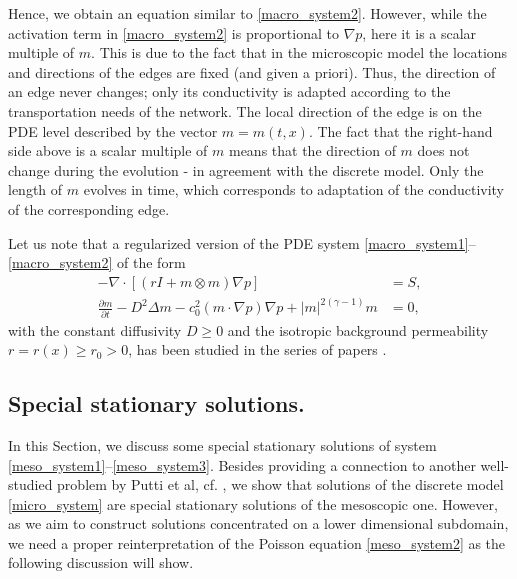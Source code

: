 \documentclass{article}
\numberwithin{equation}{section}
\begin{document}
Hence, we obtain an equation similar to \eqref{macro_system2}. However, while the activation term in \eqref{macro_system2}
is proportional to $\nabla p$, here it is a scalar multiple of $m$. This is due to the fact that in the microscopic model the locations
and directions of the edges are fixed (and given a priori). Thus, the direction of an edge never changes;
only its conductivity is adapted according to the transportation needs of the network.
The local direction of the edge is on the PDE level described by the vector $m=m(t,x)$.
The fact that the right-hand side above is a scalar multiple of $m$ means that the
direction of $m$ does not change during the evolution - in agreement with the discrete model.
Only the length of $m$ evolves in time, which corresponds to adaptation of the conductivity of the corresponding edge.

Let us note that a regularized version of the PDE system \eqref{macro_system1}--\eqref{macro_system2} of the form
\begin{align*}
   -\nabla \cdot [(rI+m\otimes m )\nabla p]&=S, \\
   \frac{\partial m}{\partial t}-D^2 \Delta m -c_0^2 (m\cdot \nabla p)\nabla p +|m|^{2(\gamma-1)}m&=0,
\end{align*}
with the constant diffusivity $D\geq 0$ and the isotropic background permeability $r = r(x)\geq r_0 > 0$,
has been studied in the series of papers \cite{haskovec2015mathematical, haskovec2016notes, albi2016biological, albi2017continuum}.



\subsection{Special stationary solutions.}\label{subsec:special}
In this Section, we discuss some special stationary solutions of system \eqref{meso_system1}--\eqref{meso_system3}.
Besides providing a connection to another well-studied problem by Putti et al, cf. \cite{facca2018towards},
we show that solutions of the discrete model \eqref{micro_system} are special stationary solutions of the mesoscopic one.
However, as we aim to construct solutions concentrated on a lower dimensional subdomain,
we need a proper reinterpretation of the Poisson equation \eqref{meso_system2} as the following discussion will show. 
\end{document}

